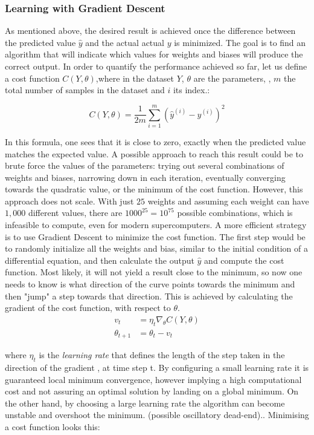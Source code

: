 \subsubsection{Learning with Gradient Descent}

As mentioned above, the desired result is achieved once the difference between the predicted value $\hat{y}$ and the actual actual $y$ is minimized. The goal is to find an algorithm that will indicate which values for weights and biases will produce the correct output. In order to quantify the performance achieved so far, let us define a cost function $C(Y,\theta)$,where in the  dataset $Y$, $\theta$ are the parameters, , $m$ the total number of samples in the dataset and $i$ its index.:

\begin{equation}
 	C(Y,\theta) = \frac{1}{2m}\sum_{i=1}^{m}(\hat{y}^{(i)} - y^{(i)})^2
\end{equation}

In this formula, one sees that it is close to zero, exactly when the predicted value matches the expected value. A possible approach to reach this result could be to brute force the values of the parameters: trying out several combinations of weights and biases, narrowing down in each iteration, eventually converging towards the quadratic value, or the minimum of the cost function. However, this approach does not scale. With just $25$ weights and assuming each weight can have $1,000$ different values, there are $1000^{25} =10^{75}$ possible combinations, which is infeasible to compute, even for modern supercomputers\cite{ml_phys}.
A more efficient strategy is to use Gradient Descent to minimize the cost function. The first step would be to randomly initialize all the weights and bias, similar to the initial condition of a differential equation, and then calculate the output $\hat{y}$ and compute the cost function. Most likely, it will not yield a result close to the minimum, so now one needs to know is what direction of the curve points towards the minimum and then "jump" a step towards that direction. This is achieved by calculating the gradient of the cost function, with respect to $\theta$.
\begin{align}
	v_t &= \eta_t \nabla_{\theta} C(Y,\theta) \\
	\theta_{t+1} &= 	\theta_{t}  - v_t
\end{align}

where  $\eta_t$ is the \textit{learning rate} that defines the length of the step taken in the direction of the gradient , at time step t. By configuring a small learning rate it is guaranteed local minimum convergence, however implying a high computational cost and not assuring an optimal solution by landing on a global minimum. On the other hand, by choosing a large learning rate the algorithm can become unstable and overshoot the minimum. (possible oscillatory dead-end).\cite{ml_phys}.  Minimising a cost function looks this:

